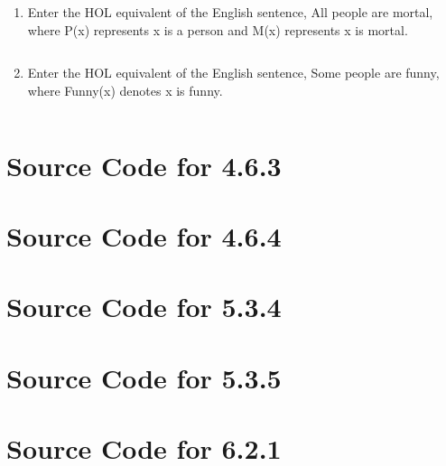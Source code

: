 \documentclass[twoside]{report}
\begin{document}
\begin{enumerate}
\begin{enumerate}
\begin{scriptsize}
    \begin{verbatim}
    \end{verbatim}
\end{scriptsize}
        \item Enter the HOL equivalent of the English sentence, All people are mortal, where P(x) represents x is a person and M(x) represents x is mortal.
\begin{scriptsize}
    \begin{verbatim}
    \end{verbatim}
\end{scriptsize}
        \item Enter the HOL equivalent of the English sentence, Some people are funny, where Funny(x) denotes x is funny.
\begin{scriptsize}
    \begin{verbatim}
    \end{verbatim}
\end{scriptsize}
    \end{enumerate}
\end{enumerate}

\appendix{}
\chapter{Source Code for 4.6.3}
\label{cha:apdx-a}


\chapter{Source Code for 4.6.4}
\label{cha:apdx-b}


\chapter{Source Code for 5.3.4}
\label{cha:apdx-c}


\chapter{Source Code for 5.3.5}
\label{cha:apdx-d}
%

\chapter{Source Code for 6.2.1}
\label{cha:apdx-e}
%
\end{document}
